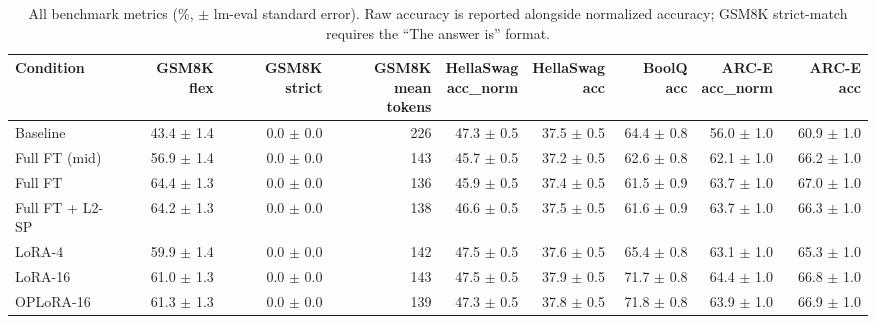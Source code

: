 \begin{table}[t]
\centering
\small
\caption{All benchmark metrics (\%, $\pm$ lm-eval standard error). Raw accuracy is reported alongside normalized accuracy; GSM8K strict-match requires the “The answer is” format.}
\label{tab:t1-bench-full}
\begin{tabular}{lrrrrrrrr}
\toprule
Condition & GSM8K flex & GSM8K strict & \makecell{GSM8K mean\\tokens} & \makecell{HellaSwag\\acc\_norm} & \makecell{HellaSwag\\acc} & BoolQ acc & \makecell{ARC-E\\acc\_norm} & ARC-E acc \\
\midrule
Baseline & 43.4 $\pm$ 1.4 & 0.0 $\pm$ 0.0 & 226 & 47.3 $\pm$ 0.5 & 37.5 $\pm$ 0.5 & 64.4 $\pm$ 0.8 & 56.0 $\pm$ 1.0 & 60.9 $\pm$ 1.0 \\
Full FT (mid) & 56.9 $\pm$ 1.4 & 0.0 $\pm$ 0.0 & 143 & 45.7 $\pm$ 0.5 & 37.2 $\pm$ 0.5 & 62.6 $\pm$ 0.8 & 62.1 $\pm$ 1.0 & 66.2 $\pm$ 1.0 \\
Full FT & 64.4 $\pm$ 1.3 & 0.0 $\pm$ 0.0 & 136 & 45.9 $\pm$ 0.5 & 37.4 $\pm$ 0.5 & 61.5 $\pm$ 0.9 & 63.7 $\pm$ 1.0 & 67.0 $\pm$ 1.0 \\
Full FT + L2-SP & 64.2 $\pm$ 1.3 & 0.0 $\pm$ 0.0 & 138 & 46.6 $\pm$ 0.5 & 37.5 $\pm$ 0.5 & 61.6 $\pm$ 0.9 & 63.7 $\pm$ 1.0 & 66.3 $\pm$ 1.0 \\
LoRA-4 & 59.9 $\pm$ 1.4 & 0.0 $\pm$ 0.0 & 142 & 47.5 $\pm$ 0.5 & 37.6 $\pm$ 0.5 & 65.4 $\pm$ 0.8 & 63.1 $\pm$ 1.0 & 65.3 $\pm$ 1.0 \\
LoRA-16 & 61.0 $\pm$ 1.3 & 0.0 $\pm$ 0.0 & 143 & 47.5 $\pm$ 0.5 & 37.9 $\pm$ 0.5 & 71.7 $\pm$ 0.8 & 64.4 $\pm$ 1.0 & 66.8 $\pm$ 1.0 \\
OPLoRA-16 & 61.3 $\pm$ 1.3 & 0.0 $\pm$ 0.0 & 139 & 47.3 $\pm$ 0.5 & 37.8 $\pm$ 0.5 & 71.8 $\pm$ 0.8 & 63.9 $\pm$ 1.0 & 66.9 $\pm$ 1.0 \\
\bottomrule
\end{tabular}
\end{table}
